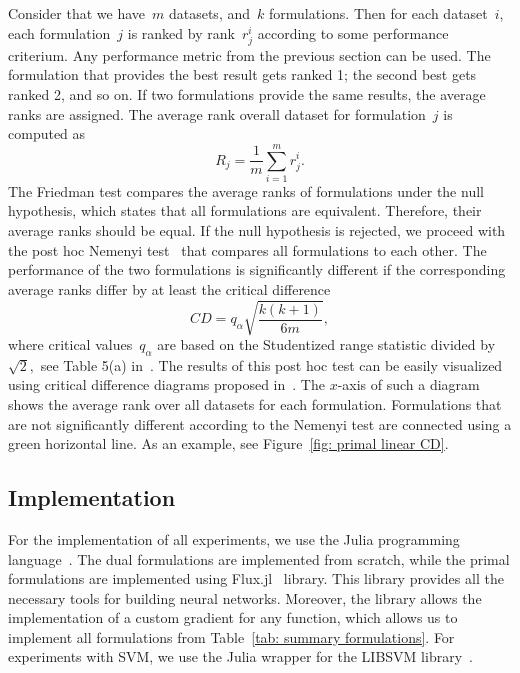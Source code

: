 Consider that we have~$m$ datasets, and~$k$ formulations. Then for each dataset~$i$, each formulation~$j$ is ranked by rank~$r^i_j$ according to some performance criterium. Any performance metric from the previous section can be used. The formulation that provides the best result gets ranked 1; the second best gets ranked 2, and so on. If two formulations provide the same results, the average ranks are assigned. The average rank overall dataset for formulation~$j$ is computed as
\begin{equation*}
  R_j = \frac{1}{m} \sum_{i = 1}^{m} r^{i}_{j}.
\end{equation*}
The Friedman test compares the average ranks of formulations under the null hypothesis, which states that all formulations are equivalent. Therefore, their average ranks should be equal. If the null hypothesis is rejected, we proceed with the post hoc Nemenyi test~\cite{nemenyi1963distribution} that compares all formulations to each other. The performance of the two formulations is significantly different if the corresponding average
ranks differ by at least the critical difference
\begin{equation*}
  CD = q_{\alpha} \sqrt{\frac{k(k + 1)}{6m}},
\end{equation*}
where critical values~$q_{\alpha}$ are based on the Studentized range statistic divided by~$\sqrt{2},$ see Table 5(a) in~\cite{demvsar2006statistical}. The results of this post hoc test can be easily visualized using critical difference diagrams proposed in~\cite{demvsar2006statistical}. The $x$-axis of such a diagram shows the average rank over all datasets for each formulation. Formulations that are not significantly different according to the Nemenyi test are connected using a green horizontal line. As an example, see Figure~\ref{fig: primal linear CD}.

\subsection{Implementation}

For the implementation of all experiments, we use the Julia programming language~\cite{bezanson2017julia}. The dual formulations are implemented from scratch, while the primal formulations are implemented using Flux.jl~\cite{innes2018flux, innes2018fashionable} library. This library provides all the necessary tools for building neural networks. Moreover, the library allows the implementation of a custom gradient for any function, which allows us to implement all formulations from Table~\ref{tab: summary formulations}. For experiments with SVM, we use the Julia wrapper for the LIBSVM library~\cite{chang2011libsvm}.


